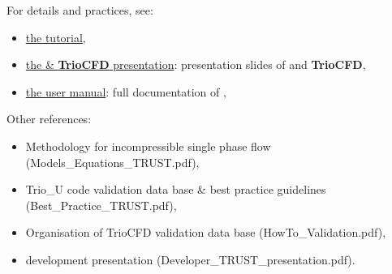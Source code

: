 For details and practices, see:
\begin{itemize}
\item \href{TRUST_tutorial.pdf}{the \trust tutorial},
\item \href{TRUST_and_TrioCFD_presentation.pdf}{the \trust \& \textbf{TrioCFD} presentation}: presentation slides of \trust and \textbf{TrioCFD},
\item \href{User_Manual_TRUST.pdf}{the \trust user manual}: full documentation of \trust,
\end{itemize}

Other references:
\begin{itemize}
\item Methodology for incompressible single phase flow (Models\_Equations\_TRUST.pdf),
\item Trio\_U code validation data base \& best practice guidelines (Best\_Practice\_TRUST.pdf),
\item Organisation of TrioCFD validation data base (HowTo\_Validation.pdf),
\item \trust development presentation (Developer\_TRUST\_presentation.pdf).
\end{itemize}
